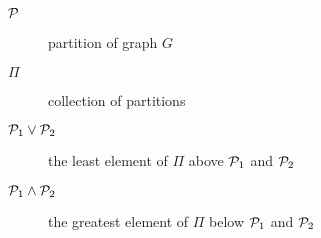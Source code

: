 \begin{description}
\item[$\P$] partition of graph $G$
\item[$\Pi$] collection of partitions
\item[$\P_1 \vee \P_2$] the least element of $\Pi$ above $\P_1$ and $\P_2$
\item[$\P_1 \wedge \P_2$] the greatest element of $\Pi$ below $\P_1$ and $\P_2$
\end{description}

